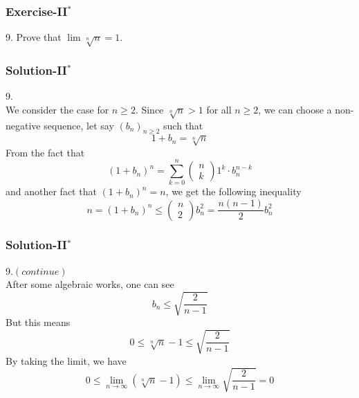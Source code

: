 \documentclass[12pt, t]{beamer}
\begin{document}
\begin{frame}
    \frametitle{Exercise-II$^*$}
9. Prove that $\lim \sqrt[n]{n}=1$.
\end{frame}

\begin{frame}
    \frametitle{Solution-II$^*$}
9.\\
\hspace{1em} We consider the case for $n\geq 2$. Since $\sqrt[n]{n}>1$ for all $n\geq 2$, we can choose a 
non-negative sequence, let say $(b_n)_{n\geq 2}$ such that
\begin{equation*}
    1+b_n=\sqrt[n]{n}
\end{equation*}
\hspace{1em} From the fact that 
\begin{equation*}
    (1+b_n)^n=\sum^n_{k=0}\left(\begin{smallmatrix}n\\k\end{smallmatrix}\right)1^k\cdot b_n^{n-k}
\end{equation*}
and another fact that $(1+b_n)^n=n$, we get the following inequality
\begin{equation*}
    n=(1+b_n)^n\leq \left(\begin{smallmatrix}n \\ 2\end{smallmatrix}\right) b^2_n=\frac{n(n-1)}{2}b^2_n
\end{equation*}
\end{frame}

\begin{frame}
    \frametitle{Solution-II$^*$}
9.$(continue)$\\
\hspace{1em} After some algebraic works, one can see 
\begin{equation*}
    b_n\leq\sqrt{\frac{2}{n-1}}
\end{equation*}
\hspace{1em} But this means 
\begin{equation*}
    0\leq \sqrt[n]{n}-1\leq \sqrt{\frac{2}{n-1}}
\end{equation*}
\hspace{1em} By taking the limit, we have
\begin{equation*}
    0\leq \lim_{n\rightarrow\infty}(\sqrt[n]{n}-1)\leq \lim_{n\rightarrow\infty}\sqrt{\frac{2}{n-1}}=0
\end{equation*}
\end{frame}
\end{document}
